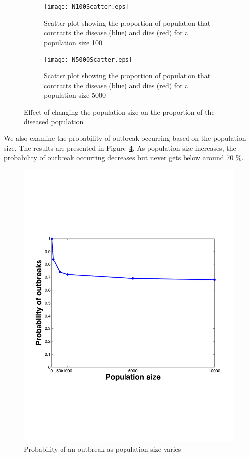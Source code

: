 \begin{figure} [h!]
\centering 
\begin{subfigure}[b]{0.3\textwidth} \texttt{[image: N100Scatter.eps]} \caption{Scatter plot showing the proportion of population that contracts the disease (blue) and dies (red) for a population size 100} \label{fig:N100} \end{subfigure} 
\hspace{2cm}
 \begin{subfigure}[b]{0.3\textwidth} \texttt{[image: N5000Scatter.eps]} \caption{Scatter plot showing the proportion of population that contracts the disease (blue) and dies (red) for a population size 5000} \label{fig:N5000} \end{subfigure} 
 \caption{Effect of changing the population size on the proportion of the diseased population} %
 \label{fig:VarPopSize}
  \end{figure}
We also examine the probability of outbreak occurring based on the population size. The results are presented in Figure~\ref{fig:OtbreakProb}. As population size increases, the probability of outbreak occurring decreases but never gets below around 70 \%. 
\begin{figure}[h!]
\begin{center}
\includegraphics[scale=0.5]{OutbreakProb}
\end{center}
\caption{Probability of an outbreak as population size varies}
\label{fig:OtbreakProb}
\end{figure}
